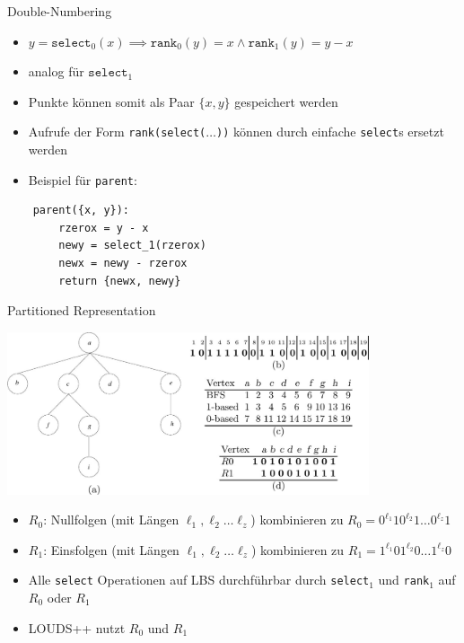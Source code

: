 \documentclass[ngerman,aspectratio=169,10pt]{beamer}
\begin{document}
\begin{frame}[fragile]{Double-Numbering}
    \begin{itemize}
        \item $y=\texttt{select}_0(x)\implies \texttt{rank}_0(y)=x\wedge \texttt{rank}_1(y)=y-x$
        \item analog für $\texttt{select}_1$
        \item Punkte können somit als Paar $\{x, y\}$ gespeichert werden
        \item Aufrufe der Form \texttt{rank(select($\dots$))} können durch einfache \texttt{select}s ersetzt werden
        \item Beispiel für \texttt{parent}:
    \end{itemize}
	\begin{lstlisting}
	parent({x, y}):
		rzerox = y - x
		newy = select_1(rzerox)
		newx = newy - rzerox
		return {newx, newy}
	\end{lstlisting}
\end{frame}

\begin{frame}{Partitioned Representation}
    \begin{center}
        \includegraphics[width=0.8\textwidth]{LOUDS.jpg}
    \end{center}
    \begin{itemize}
        \item $R_0$: Nullfolgen (mit Längen $\ell_1,\ell_2\ldots\ell_z$) kombinieren zu $R_0=0^{\ell_1}10^{\ell_2}1\ldots0^{\ell_z}1$
        \item  $R_1$: Einsfolgen (mit Längen $\ell_1,\ell_2\ldots\ell_z$) kombinieren zu $R_1=1^{\ell_1}01^{\ell_2}0\ldots1^{\ell_z}0$
        \item Alle \texttt{select} Operationen auf LBS durchführbar durch \texttt{select}$_1$ und \texttt{rank}$_1$ auf $R_0$ oder $R_1$
        \item LOUDS++ nutzt $R_0$ und $R_1$
    \end{itemize}
\end{frame}
\end{document}
